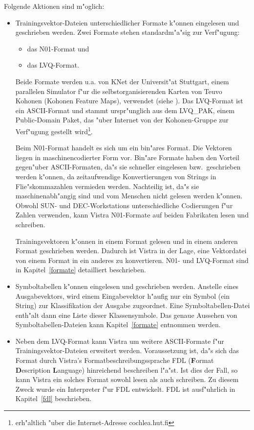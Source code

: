 Folgende Aktionen sind m"oglich:
\begin{itemize}

\item Trainingsvektor-Dateien unterschiedlicher Formate k"onnen eingelesen
und geschrieben werden. 
Zwei Formate stehen standardm"a"sig zur Verf"ugung:
\begin{itemize}
\item das N01-Format und
\item das LVQ-Format.
\end{itemize}
Beide Formate werden u.a. von KNet der Universit"at Stuttgart,
einem parallelen Simulator f"ur die selbstorganisierenden Karten
von Teuvo Kohonen (Kohonen Feature Maps), verwendet
(siehe \cite{bayer}). 
Das LVQ-Format ist ein ASCII-Format und stammt urspr"unglich
aus dem LVQ\_PAK, einem Public-Domain Paket, das "uber 
Internet von der Kohonen-Gruppe zur Verf"ugung gestellt 
wird\footnote{erh"altlich "uber die Internet-Adresse cochlea.hut.fi}.

Beim N01-Format handelt es sich um ein bin"ares Format. 
Die Vektoren liegen in maschinencodierter Form vor.
Bin"are Formate haben den Vorteil gegen"uber ASCII-Formaten, da"s sie
schneller eingelesen bzw.~geschrieben werden k"onnen, da 
zeitaufwendige Konvertierungen von Strings in Flie"skommazahlen 
vermieden werden.
Nachteilig ist, da"s sie maschinenabh"angig sind und vom Menschen
nicht gelesen werden k"onnen. 
Obwohl SUN- und DEC-Workstations unterschiedliche Codierungen f"ur
Zahlen verwenden, kann Vistra N01-Formate auf beiden Fabrikaten
lesen und schreiben.

Trainingsvektoren k"onnen in einem Format gelesen und in einem anderen
Format geschrieben werden.
Dadurch ist Vistra in der Lage, eine Vektordatei
von einem Format in ein anderes zu konvertieren.
N01- und LVQ-Format sind in Kapitel~\ref{formate} detailliert beschrieben.

\item Symboltabellen k"onnen eingelesen und geschrieben werden. 
Anstelle eines Ausgabevektors, wird einem Eingabevektor h"aufig nur
ein Symbol (ein String) zur Klassifikation der Ausgabe zugeordnet.
Eine Symboltabellen-Datei enth"alt dann eine Liste dieser Klassensymbole. 
Das genaue Aussehen von Symboltabellen-Dateien kann Kapitel~\ref{formate}
entnommen werden.

\item Neben dem LVQ-Format kann Vistra um weitere ASCII\--For\-mate 
f"ur Trainings\-vektor-Dateien erweitert werden.
Voraussetzung ist, da"s sich das Format durch Vistra's 
Formatbeschreibungssprache FDL ({\bf F}ormat {\bf D}escription 
{\bf L}anguage) 
hinreichend beschreiben l"a"st.
Ist dies der Fall, so kann Vistra ein solches Format sowohl lesen als
auch schreiben.
Zu diesem Zweck wurde ein Interpreter f"ur FDL entwickelt. 
FDL ist ausf"uhrlich in Kapitel~\ref{fdl} beschrieben.  


\end{itemize}
